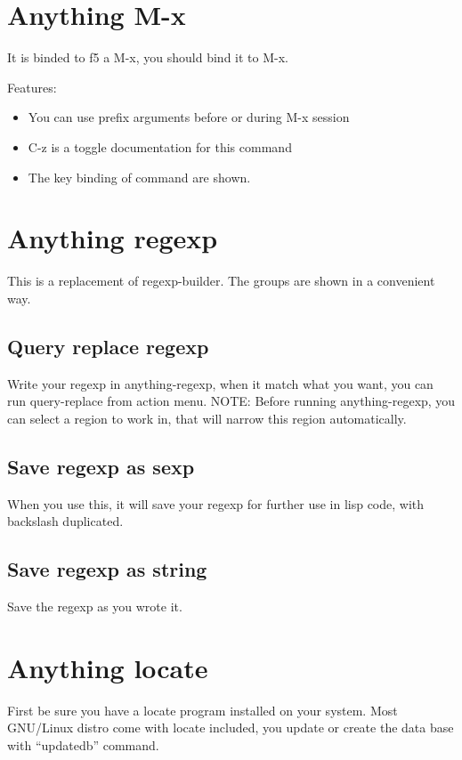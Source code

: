 \documentclass[a4paper,11pt]{article}
\begin{document}
\section{Anything M-x}
\label{sec:anything-m-x}
It is binded to f5 a M-x, you should bind it to M-x.

Features:\\
\begin{itemize}
\item You can use prefix arguments before or during M-x session
\end{itemize}
\begin{itemize}
\item C-z is a toggle documentation for this command
\end{itemize}
\begin{itemize}
\item The key binding of command are shown.
\end{itemize}

\section{Anything regexp}
\label{sec:anything-regexp}
This is a replacement of regexp-builder.
The groups are shown in a convenient way.

\subsection{Query replace regexp}
\label{sec:query-replace-regexp}
Write your regexp in anything-regexp, when it match what you want,
you can run query-replace from action menu.
NOTE:
Before running anything-regexp, you can select a region to work in, that will narrow this region
automatically. 
\subsection{Save regexp as sexp}
\label{sec:save-regexp-as}
When you use this, it will save your regexp for further use in lisp code,
with backslash duplicated.

\subsection{Save regexp as string}
\label{sec:save-regexp-as-1}
Save the regexp as you wrote it.

\section{Anything locate}
\label{sec:anything-locate}
First be sure you have a locate program installed on your system.
Most GNU/Linux distro come with locate included, you update or create the data base with
``updatedb'' command.
\end{document}
